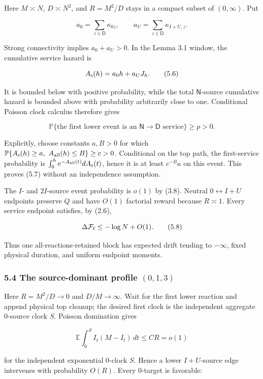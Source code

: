 Here \(M\asymp N\), \(D\asymp N^2\), and \(R=M^2/D\) stays in a compact
subset of \((0,\infty)\). Put

\[
 a_0=\sum_{z\in{\mathsf D}}\kappa_{0z},\qquad
 a_U=\sum_{z\in{\mathsf D}}\kappa_{I+U,z}.             \tag{5.5}
\]

Strong connectivity implies \(a_0+a_U>0\). In the Lemma 3.1 window, the
cumulative service hazard is

\[
 A_{\rm s}(h)=a_0h+a_UJ_h.                             \tag{5.6}
\]

It is bounded below with positive probability, while the total
\({\mathsf N}\)-source cumulative hazard is bounded above with
probability arbitrarily close to one. Conditional Poisson clock calculus
therefore gives

\[
 {\mathbb P}\{\text{the first lower event is an }
 {\mathsf N}\to{\mathsf D}\text{ service}\}\ge p>0.    \tag{5.7}
\]

Explicitly, choose constants \(a,B>0\) for which
\({\mathbb P}\{A_{\rm s}(h)\ge a,\ A_{\rm all}(h)\le B\}\ge c>0\).
Conditional on the top path, the first-service probability is
\(\int_0^h e^{-A_{\rm all}(t)}dA_{\rm s}(t)\), hence it is at least
\(e^{-B}a\) on this event. This proves (5.7) without an independence
assumption.

The \(I\)- and \(2I\)-source event probability is \(o(1)\) by (3.8).
Neutral \(0\leftrightarrow I+U\) endpoints preserve \(Q\) and have
\(O(1)\) factorial reward because \(R\asymp1\). Every service endpoint
satisfies, by (2.6),

\[
 \Delta{\cal F}_\ell\le-\log N+O(1).                  \tag{5.8}
\]

Thus one all-reactions-retained block has expected drift tending to
\(-\infty\), fixed physical duration, and uniform endpoint moments.

\subsubsection{\texorpdfstring{5.4 The source-dominant profile
\((0,1,3)\)}{5.4 The source-dominant profile (0,1,3)}}

Here \(R=M^2/D\to0\) and \(D/M\to\infty\). Wait for the first lower
reaction and append physical top cleanup; the desired first clock is the
independent aggregate \(0\)-source clock \(S\). Poisson domination gives

\[
 {\mathbb E}\int_0^S I_t(M-I_t)\,dt\le C R=o(1)       \tag{5.9}
\]

for the independent exponential \(0\)-clock \(S\). Hence a lower
\(I+U\)-source edge intervenes with probability \(O(R)\). Every
\(0\)-target is favorable:

